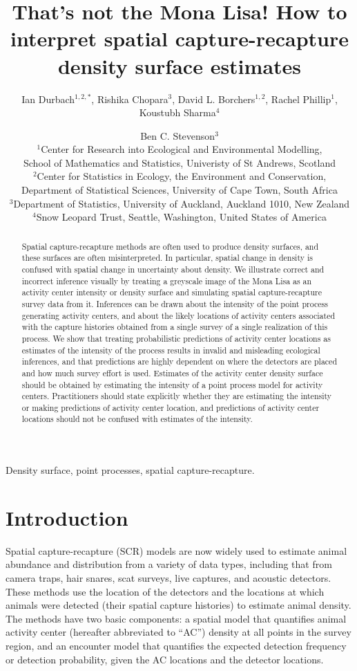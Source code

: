 \documentclass[useAMS,usenatbib,referee]{biom}
\title[How to interpret SCR density surface estimates]{That's not the Mona Lisa! How to interpret spatial capture-recapture density surface estimates}
\author{Ian Durbach$^{1,2,*}$, Rishika Chopara$^{3}$, David L. Borchers$^{1,2}$, Rachel Phillip$^{1}$, Koustubh Sharma$^{4}$ \and Ben C. Stevenson$^{3}$ \\
$^{1}$Center for Research into Ecological and Environmental Modelling, \\ School of Mathematics and Statistics, Univeristy of St Andrews, Scotland \\
$^{2}$Center for Statistics in Ecology, the Environment and Conservation, \\ Department of Statistical Sciences, University of Cape Town, South Africa \\
$^{3}$Department of Statistics, University of Auckland, Auckland 1010, New Zealand \\
$^{4}$Snow Leopard Trust, Seattle, Washington, United States of America \\
\email{indurbach@gmail.com}}
\begin{document}
\begin{abstract}
Spatial capture-recapture methods are often used to produce density surfaces, and these surfaces are often misinterpreted. In particular, spatial change in density is confused with spatial change in uncertainty about density. We illustrate correct and incorrect inference visually by treating a greyscale image of the Mona Lisa as an activity center intensity or density surface and simulating spatial capture-recapture survey data from it. Inferences can be drawn about the intensity of the point process generating activity centers, and about the likely locations of activity centers associated with the capture histories obtained from a single survey of a single realization of this process. We show that treating probabilistic predictions of activity center locations as estimates of the intensity of the process results in invalid and misleading ecological inferences, and that predictions are highly dependent on where the detectors are placed and how much survey effort is used. Estimates of the activity center density surface should be obtained by estimating the intensity of a point process model for activity centers. Practitioners should state explicitly whether they are estimating the intensity or making predictions of activity center location, and predictions of activity center locations should not be confused with estimates of the intensity.
\end{abstract}


\begin{keywords}
Density surface, point processes, spatial capture-recapture.
\end{keywords}

\maketitle 

\section{Introduction}

Spatial capture-recapture (SCR) models \citep*{Efford:04,Borchers+Efford:08, Royle+Young:08} are now widely used to estimate animal abundance and distribution from a variety of data types, including that from camera traps, hair snares, scat surveys, live captures, and acoustic detectors. These methods use the location of the detectors and the locations at which animals were detected (their spatial capture histories) to estimate animal density. The methods have two basic components: a spatial model that quantifies animal activity center (hereafter abbreviated to ``AC'') density at all points in the survey region, and an encounter model that quantifies the expected detection frequency or detection probability, given the AC locations and the detector locations. 
\end{document}
